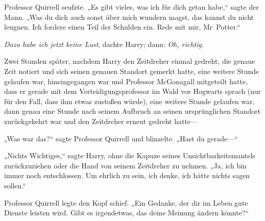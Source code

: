 Professor Quirrell seufzte. „Es gibt vieles, was ich für dich getan habe,“ sagte der Mann. „Was du dich auch sonst über mich wundern magst, das kannst du nicht leugnen. Ich fordere einen Teil der Schulden ein. Rede mit mir, Mr~Potter.“

\emph{Dazu habe ich jetzt keine Lust}, dachte Harry; dann: \emph{Oh, richtig.}

\later

Zwei Stunden später, nachdem Harry den Zeitdreher einmal gedreht, die genaue Zeit notiert und sich seinen genauen Standort gemerkt hatte, eine weitere Stunde gelaufen war, hineingegangen war und Professor McGonagall mitgeteilt hatte, dass er gerade mit dem Verteidigungsprofessor im Wald vor Hogwarts sprach (nur für den Fall, dass ihm etwas zustoßen würde), eine weitere Stunde gelaufen war, dann genau eine Stunde nach seinem Aufbruch an seinen ursprünglichen Standort zurückgekehrt war und den Zeitdreher erneut gedreht hatte—

\later

„Was war das?“ sagte Professor Quirrell und blinzelte. „Hast du gerade—“

„Nichts Wichtiges,“ sagte Harry, ohne die Kapuze seines Unsichtbarkeitsmantels zurückzuziehen oder die Hand von seinem Zeitdreher zu nehmen. „Ja, ich bin immer noch entschlossen. Um ehrlich zu sein, ich denke, ich hätte nichts sagen sollen.“

Professor Quirrell legte den Kopf schief. „Ein Gedanke, der dir im Leben gute Dienste leisten wird. Gibt es irgendetwas, das deine Meinung ändern könnte?“

